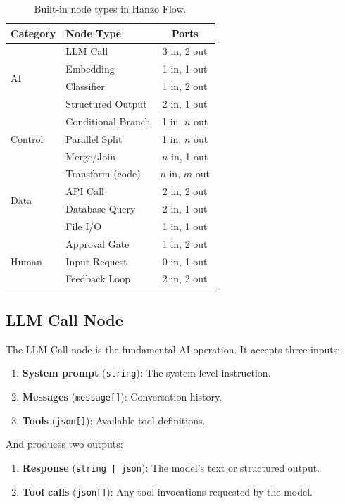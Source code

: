 \documentclass[11pt,twocolumn]{article}
\begin{document}
\begin{table}[H]
\centering
\small
\begin{tabular}{llc}
\toprule
\textbf{Category} & \textbf{Node Type} & \textbf{Ports} \\
\midrule
\multirow{4}{*}{AI} & LLM Call & 3 in, 2 out \\
& Embedding & 1 in, 1 out \\
& Classifier & 1 in, 2 out \\
& Structured Output & 2 in, 1 out \\
\midrule
\multirow{3}{*}{Control} & Conditional Branch & 1 in, $n$ out \\
& Parallel Split & 1 in, $n$ out \\
& Merge/Join & $n$ in, 1 out \\
\midrule
\multirow{4}{*}{Data} & Transform (code) & $n$ in, $m$ out \\
& API Call & 2 in, 2 out \\
& Database Query & 2 in, 1 out \\
& File I/O & 1 in, 1 out \\
\midrule
\multirow{3}{*}{Human} & Approval Gate & 1 in, 2 out \\
& Input Request & 0 in, 1 out \\
& Feedback Loop & 2 in, 2 out \\
\bottomrule
\end{tabular}
\caption{Built-in node types in Hanzo Flow.}
\label{tab:nodes}
\end{table}

\subsection{LLM Call Node}

The LLM Call node is the fundamental AI operation. It accepts three inputs:

\begin{enumerate}[leftmargin=1.4em]
    \item \textbf{System prompt} (\texttt{string}): The system-level instruction.
    \item \textbf{Messages} (\texttt{message[]}): Conversation history.
    \item \textbf{Tools} (\texttt{json[]}): Available tool definitions.
\end{enumerate}

And produces two outputs:
\begin{enumerate}[leftmargin=1.4em]
    \item \textbf{Response} (\texttt{string | json}): The model's text or structured output.
    \item \textbf{Tool calls} (\texttt{json[]}): Any tool invocations requested by the model.
\end{enumerate}
\end{document}
